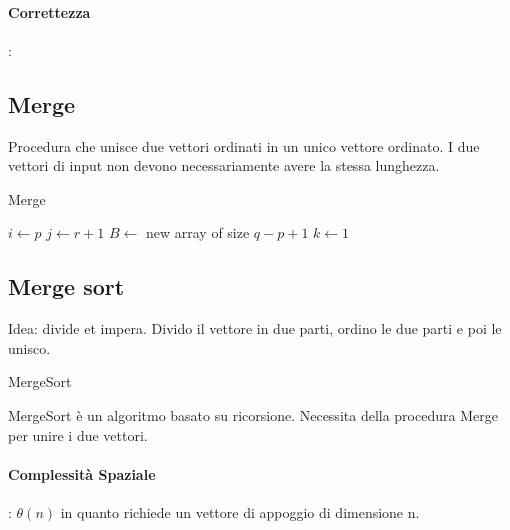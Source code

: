 \documentclass{article}
\DeclarePairedDelimiter\floor{\lfloor}{\rfloor}
\begin{document}
\paragraph{Correttezza}:

\newpage

\subsection{Merge} %
Procedura che unisce due vettori ordinati in un unico vettore ordinato. I due vettori di input non devono necessariamente avere la stessa lunghezza. 

\begin{algorithm}[H]
\caption{Merge}
$i \leftarrow p$\;
$j \leftarrow r + 1$\;
$B \leftarrow$ new array of size $q - p + 1$\;
$k \leftarrow 1$\;
\end{algorithm}

\subsection{Merge sort} %
Idea: divide et impera. Divido il vettore in due parti, ordino le due parti e poi le unisco.

\begin{algorithm}[H]
\caption{MergeSort}
\end{algorithm}

MergeSort è un algoritmo basato su ricorsione. Necessita della procedura Merge per unire i due vettori.

\paragraph{Complessità Spaziale}: $\theta(n)$ in quanto richiede un vettore di appoggio di dimensione n.
\end{document}
